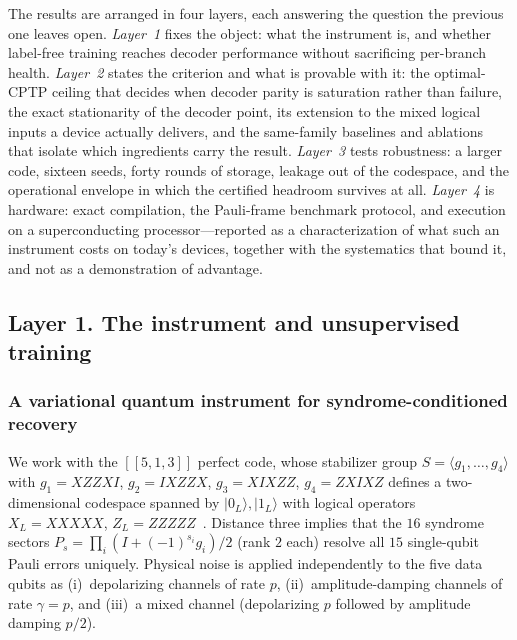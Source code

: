 \documentclass[aps,prxquantum,reprint,superscriptaddress]{revtex4-2}
\newcommand{\ket}[1]{\lvert #1\rangle}
\newcommand{\code}{[\![5,1,3]\!]}
\begin{document}
The results are arranged in four layers, each answering the question the previous
one leaves open. \emph{Layer~1} fixes the object: what the instrument is, and
whether label-free training reaches decoder performance without sacrificing
per-branch health. \emph{Layer~2} states the criterion and what is provable with
it: the optimal-CPTP ceiling that decides when decoder parity is saturation rather
than failure, the exact stationarity of the decoder point, its extension to the
mixed logical inputs a device actually delivers, and the same-family baselines and
ablations that isolate which ingredients carry the result. \emph{Layer~3} tests
robustness: a larger code, sixteen seeds, forty rounds of storage, leakage out of
the codespace, and the operational envelope in which the certified headroom
survives at all. \emph{Layer~4} is hardware: exact compilation, the Pauli-frame
benchmark protocol, and execution on a superconducting processor---reported as a
characterization of what such an instrument costs on today's devices, together
with the systematics that bound it, and not as a demonstration of advantage.

\subsection*{Layer 1. The instrument and unsupervised training}

\subsubsection*{A variational quantum instrument for syndrome-conditioned recovery}

We work with the $\code$ perfect code, whose stabilizer group
$S=\langle g_1,\dots,g_4\rangle$ with
$g_1=XZZXI$, $g_2=IXZZX$, $g_3=XIXZZ$, $g_4=ZXIXZ$ defines a
two-dimensional codespace spanned by $\ket{0_L},\ket{1_L}$ with logical
operators $X_L=XXXXX$, $Z_L=ZZZZZ$~\cite{laflamme_5q,gottesman_hamming}.
Distance three implies that the $16$ syndrome sectors
$P_s=\prod_i (I+(-1)^{s_i}g_i)/2$ (rank $2$ each) resolve all $15$
single-qubit Pauli errors uniquely. Physical noise is applied independently
to the five data qubits as (i)~depolarizing channels of rate $p$,
(ii)~amplitude-damping channels of rate $\gamma=p$, and (iii)~a mixed channel
(depolarizing $p$ followed by amplitude damping $p/2$).
\end{document}
